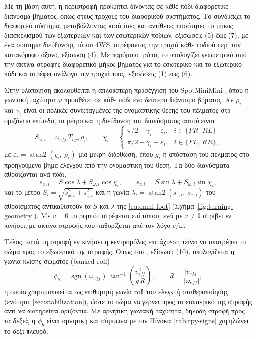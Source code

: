 \documentclass[11pt]{report}
\begin{document}
Με τη βάση αυτή, η περιστροφή προκύπτει δίνοντας σε κάθε πόδι διαφορετικό
διάνυσμα βήματος, όπως στους τροχούς του διαφορικού συστήματος. Το
\cite{lee_turning_2014} συνδυάζει το διαφορικό σύστημα, μεταβάλλοντας κατά ίσες
και αντίθετες ποσότητες το μήκος διασκελισμού των εξωτερικών και των εσωτερικών
ποδιών, εξισώσεις (5) έως (7), με ένα σύστημα διεύθυνσης τύπου 4WS, στρέφοντας
την τροχιά κάθε ποδιού περί τον κατακόρυφο άξονα, εξίσωση (4). Με παρόμοιο
τρόπο, το \cite{liu_turning_2017} υπολογίζει γεωμετρικά από την ακτίνα στροφής
διαφορετικό μήκος βήματος για το εσωτερικό και το εξωτερικό πόδι και στρέφει
ανάλογα την τροχιά τους, εξισώσεις (1) έως (6).

Στην υλοποίηση ακολουθείται η απλούστερη προσέγγιση του SpotMiniMini
\cite{spotminimini2020github}, όπου η γωνιακή ταχύτητα $\omega$ προσθέτει σε κάθε
πόδι ένα δεύτερο διάνυσμα βήματος. Αν $\rho_i$ και $\gamma_i$ είναι οι πολικές
συντεταγμένες της ονομαστικής θέσης του πέλματος στο οριζόντιο επίπεδο, το μέτρο
και η διεύθυνση του διανύσματος αυτού είναι
\begin{equation}
S_{\omega,i} = \omega_{eff}\,T_{cyc}\,\rho_i, \qquad
\chi_i =
\begin{cases}
\pi/2 + \gamma_i + \varepsilon_i, & i \in \{FR,\ RL\} \\
\pi/2 - \gamma_i + \varepsilon_i, & i \in \{FL,\ RR\},
\end{cases}
\label{eq:yaw-step}
\end{equation}
με $\varepsilon_i = \operatorname{atan2}(g_i,\ \rho_i)$ μια μικρή διόρθωση, όπου
$g_i$ η απόσταση του πέλματος στο προηγούμενο βήμα ελέγχου από την ονομαστική
του θέση. Τα δύο διανύσματα αθροίζονται ανά πόδι,
\begin{equation}
s_{x,i} = S\cos\lambda + S_{\omega,i}\cos\chi_i, \qquad
s_{z,i} = S\sin\lambda + S_{\omega,i}\sin\chi_i,
\label{eq:step-sum}
\end{equation}
και το μέτρο $S_i = \sqrt{s_{x,i}^2 + s_{z,i}^2}$ και η γωνία
$\lambda_i = \operatorname{atan2}(s_{z,i},\ s_{x,i})$ του αθροίσματος
αντικαθιστούν τα $S$ και $\lambda$ της \eqref{eq:omni-foot}
(Σχήμα~\ref{fig:turning-geometry}). Με $v = 0$ το
ρομπότ στρέφεται επί τόπου, ενώ με $v \neq 0$ στρίβει εν κινήσει, με ακτίνα
στροφής που καθορίζεται από τον λόγο $v/\omega$.


Τέλος, κατά τη στροφή εν κινήσει η κεντρομόλος επιτάχυνση τείνει να ανατρέψει
το σώμα προς το εξωτερικό της στροφής. Όπως στο \cite{lee_turning_2014},
εξίσωση (10), υπολογίζεται η γωνία κλίσης σώματος (banked roll)
\begin{equation}
\phi_b = \operatorname{sgn}(\omega_{eff})\,
\tan^{-1}\!\left(\frac{v_{eff}^2}{g\,R}\right), \qquad
R = \frac{|v_{eff}|}{|\omega_{eff}|},
\label{eq:banked-roll}
\end{equation}
η οποία χρησιμοποιείται ως επιθυμητή γωνία roll του ελεγκτή σταθεροποίησης
(ενότητα~\ref{sec:stabilization}), ώστε το σώμα να γέρνει προς το εσωτερικό
της στροφής αντί να διατηρείται οριζόντιο. Με αρνητική γωνιακή ταχύτητα, δηλαδή
στροφή προς τα δεξιά, η $\phi_b$ είναι αρνητική και σύμφωνα με τον
Πίνακα~\ref{tab:rpy-signs} χαμηλώνει το δεξί πλευρό.
\end{document}
